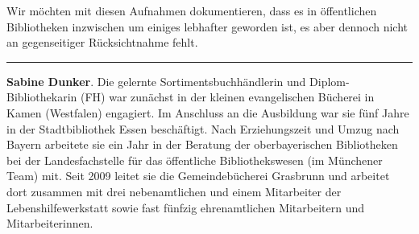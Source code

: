 \documentclass[a4paper,
fontsize=11pt,
oneside,
numbers=noperiodatend,
parskip=half-,
bibliography=totoc,
final
]{scrartcl}
\begin{document}
Wir möchten mit diesen Aufnahmen dokumentieren, dass es in öffentlichen
Bibliotheken inzwischen um einiges lebhafter geworden ist, es aber
dennoch nicht an gegenseitiger Rücksichtnahme fehlt.

\begin{center}\rule{0.5\linewidth}{0.5pt}\end{center}

\textbf{Sabine Dunker}. Die gelernte Sortimentsbuchhändlerin und
Diplom-Bibliothekarin (FH) war zunächst in der kleinen evangelischen
Bücherei in Kamen (Westfalen) engagiert. Im Anschluss an die Ausbildung
war sie fünf Jahre in der Stadtbibliothek Essen beschäftigt. Nach
Erziehungszeit und Umzug nach Bayern arbeitete sie ein Jahr in der
Beratung der oberbayerischen Bibliotheken bei der Landesfachstelle für
das öffentliche Bibliothekswesen (im Münchener Team) mit. Seit 2009
leitet sie die Gemeindebücherei Grasbrunn und arbeitet dort zusammen mit
drei nebenamtlichen und einem Mitarbeiter der Lebenshilfewerkstatt sowie
fast fünfzig ehrenamtlichen Mitarbeitern und Mitarbeiterinnen.
\end{document}
